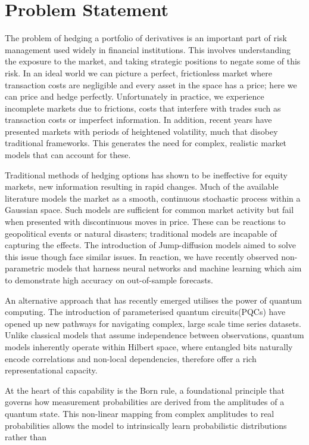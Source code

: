\documentclass[12pt]{article}
\newcommand{\newp}
    {
    \vskip 0.5cm 
  }
\numberwithin{equation}{section}
\begin{document}
\section{Problem Statement}
The problem of hedging a portfolio of derivatives is an important part of 
risk management used widely in financial institutions. This involves understanding 
the exposure to the market, and taking strategic positions to negate some of this 
risk. In an ideal world we can picture a perfect, 
frictionless market where transaction costs are negligible and every asset in 
the space has a price; here we can price and hedge perfectly. Unfortunately in 
practice, we experience incomplete markets due to frictions, costs that interfere 
with trades such as transaction costs or imperfect information. In addition, recent 
years have presented markets with periods of heightened volatility, much that disobey 
traditional frameworks. This generates the need for complex, realistic market 
models that can account for these.
\newp
Traditional methods of hedging options has shown to be ineffective for equity 
markets, new information resulting in rapid changes. Much of the available 
literature models the market as a smooth, continuous stochastic process within 
a Gaussian space. Such models are sufficient for common market activity but fail 
when presented with discontinuous moves in price. These can be reactions to 
geopolitical events or natural disasters; traditional
models are incapable of capturing the effects. The introduction of Jump-diffusion 
models aimed to solve this issue though face similar issues. In reaction, we have 
recently observed non-parametric models that harness neural networks and machine 
learning which aim to demonstrate high accuracy on out-of-sample forecasts.
\newp
An alternative approach that has recently emerged utilises the power of 
quantum computing.
The introduction of parameterised quantum circuits(PQCs) have 
opened up new pathways for navigating complex, large scale time series datasets.
Unlike classical models that assume independence between observations, quantum 
models inherently operate within Hilbert space, where entangled bits naturally 
encode correlations and non-local dependencies, therefore offer a rich representational 
capacity.
\newp 
At the heart of this capability is the Born rule, a foundational principle that 
governs how measurement probabilities are derived from the amplitudes of a 
quantum state. This non-linear mapping from complex amplitudes to real probabilities 
allows the model to intrinsically learn probabilistic distributions rather than 
\end{document}
